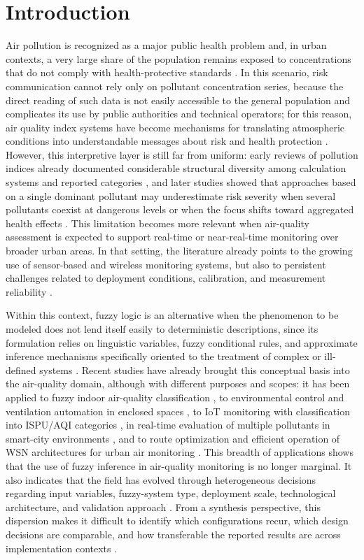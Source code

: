 \section{Introduction}

Air pollution is recognized as a major public health problem and, in urban contexts, a very large share of the population remains exposed to concentrations that do not comply with health-protective standards \cite{PROB01}. In this scenario, risk communication cannot rely only on pollutant concentration series, because the direct reading of such data is not easily accessible to the general population and complicates its use by public authorities and technical operators; for this reason, air quality index systems have become mechanisms for translating atmospheric conditions into understandable messages about risk and health protection \cite{PROB02,PROB03}. However, this interpretive layer is still far from uniform: early reviews of pollution indices already documented considerable structural diversity among calculation systems and reported categories \cite{PROB02}, and later studies showed that approaches based on a single dominant pollutant may underestimate risk severity when several pollutants coexist at dangerous levels or when the focus shifts toward aggregated health effects \cite{PROB04,PROB05}. This limitation becomes more relevant when air-quality assessment is expected to support real-time or near-real-time monitoring over broader urban areas. In that setting, the literature already points to the growing use of sensor-based and wireless monitoring systems, but also to persistent challenges related to deployment conditions, calibration, and measurement reliability \cite{PROB06,PROB07}.

Within this context, fuzzy logic is an alternative when the phenomenon to be modeled does not lend itself easily to deterministic descriptions, since its formulation relies on linguistic variables, fuzzy conditional rules, and approximate inference mechanisms specifically oriented to the treatment of complex or ill-defined systems \cite{ART03}. Recent studies have already brought this conceptual basis into the air-quality domain, although with different purposes and scopes: it has been applied to fuzzy indoor air-quality classification \cite{ART04}, to environmental control and ventilation automation in enclosed spaces \cite{ART05}, to IoT monitoring with classification into ISPU/AQI categories \cite{ART06}, in real-time evaluation of multiple pollutants in smart-city environments \cite{ART07}, and to route optimization and efficient operation of WSN architectures for urban air monitoring \cite{ART08}. This breadth of applications shows that the use of fuzzy inference in air-quality monitoring is no longer marginal. It also indicates that the field has evolved through heterogeneous decisions regarding input variables, fuzzy-system type, deployment scale, technological architecture, and validation approach \cite{ART04,ART05,ART06,ART07,ART08}. From a synthesis perspective, this dispersion makes it difficult to identify which configurations recur, which design decisions are comparable, and how transferable the reported results are across implementation contexts \cite{ART04,ART05,ART06,ART07,ART08}.

